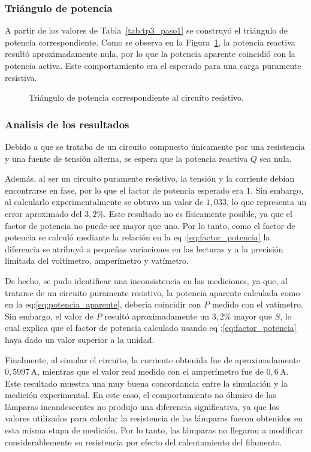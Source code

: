 \subsubsection{Triángulo de potencia}

A partir de los valores de Tabla~\ref{tab:tp3_paso1} se construyó el triángulo de potencia correspondiente. Como se observa en la Figura~\ref{fig:triangulo_resistivo}, la potencia reactiva resultó aproximadamente nula, por lo que la potencia aparente coincidió con la potencia activa. Este comportamiento era el esperado para una carga puramente resistiva.

\begin{figure}[H]
    \centering
    \caption{Triángulo de potencia correspondiente al circuito resistivo.}
    \label{fig:triangulo_resistivo}
\end{figure}

\subsubsection{Analisis de los resultados}

Debido a que se trataba de un circuito compuesto únicamente por una resistencia y una fuente de tensión alterna, se espera que la potencia reactiva \(Q\) sea nula.

Además, al ser un circuito puramente resistivo, la tensión y la corriente debían encontrarse en fase, por lo que el factor de potencia esperado era \(1\). Sin embargo, al calcularlo experimentalmente se obtuvo un valor de \(1{,}033\), lo que representa un error aproximado del \(3{,}2\%\). Este resultado no es físicamente posible, ya que el factor de potencia no puede ser mayor que uno. Por lo tanto, como el factor de potencia se calculó mediante la relación en la eq
:\eqref{eq:factor_potencia} la diferencia se atribuyó a pequeñas variaciones en las lecturas y a la precisión limitada del voltímetro, amperímetro y vatímetro.

De hecho, se pudo identificar una inconsistencia en las mediciones, ya que, al tratarse de un circuito puramente resistivo, la potencia aparente calculada como en la eq:\eqref{eq:potencia_aparente}, debería coincidir con \(P\) medido con el vatímetro. Sin embargo, el valor de \(P\) resultó aproximadamente un \(3{,}2\%\) mayor que \(S\), lo cual explica que el factor de potencia calculado usando eq
:\eqref{eq:factor_potencia} haya dado un valor superior a la unidad.

Finalmente, al simular el circuito, la corriente obtenida fue de aproximadamente \(0{,}5997\,\mathrm{A}\), mientras que el valor real medido con el amperímetro fue de \(0{,}6\,\mathrm{A}\). Este resultado muestra una muy buena concordancia entre la simulación y la medición experimental. En este caso, el comportamiento no óhmico de las lámparas incandescentes no produjo una diferencia significativa, ya que los valores utilizados para calcular la resistencia de las lámparas fueron obtenidos en esta misma etapa de medición. Por lo tanto, las lámparas no llegaron a modificar considerablemente su resistencia por efecto del calentamiento del filamento.
